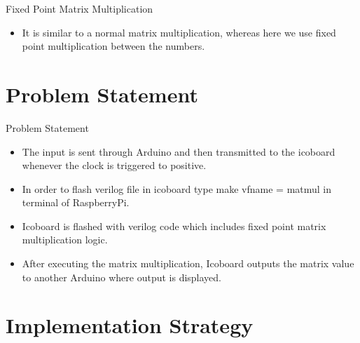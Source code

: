\documentclass[10pt]{beamer}
\begin{document}
\begin{frame}[fragile]{Fixed Point Matrix Multiplication}
\begin{itemize}
    \item It is similar to a normal matrix multiplication, whereas here we use fixed point multiplication between the numbers.
\end{itemize}
    
\end{frame}


\section{Problem Statement}

\begin{frame}{Problem Statement}
	\begin{itemize}
		 \item The input is sent through Arduino and then transmitted to the icoboard whenever the clock is triggered to positive.
		 \item In order to flash verilog file in icoboard type make v\textunderscore fname = mat\textunderscore mul in terminal of RaspberryPi.
        \item Icoboard is flashed with verilog code which includes fixed point matrix multiplication logic.
        \item After executing the matrix multiplication, Icoboard outputs the matrix value to another Arduino where output is displayed.
	\end{itemize}
	
\end{frame}

\section{Implementation Strategy}
\end{document}
